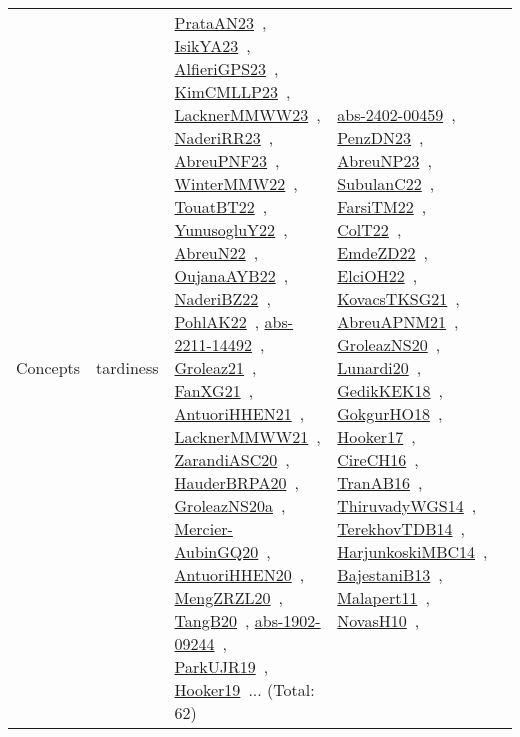 {\begin{longtable}{lp{3cm}>{\raggedright\arraybackslash}p{6cm}>{\raggedright\arraybackslash}p{6cm}>{\raggedright\arraybackslash}p{8cm}}
Concepts & tardiness & \href{works/PrataAN23.pdf}{PrataAN23}~\cite{PrataAN23}, \href{works/IsikYA23.pdf}{IsikYA23}~\cite{IsikYA23}, \href{works/AlfieriGPS23.pdf}{AlfieriGPS23}~\cite{AlfieriGPS23}, \href{works/KimCMLLP23.pdf}{KimCMLLP23}~\cite{KimCMLLP23}, \href{works/LacknerMMWW23.pdf}{LacknerMMWW23}~\cite{LacknerMMWW23}, \href{works/NaderiRR23.pdf}{NaderiRR23}~\cite{NaderiRR23}, \href{works/AbreuPNF23.pdf}{AbreuPNF23}~\cite{AbreuPNF23}, \href{works/WinterMMW22.pdf}{WinterMMW22}~\cite{WinterMMW22}, \href{works/TouatBT22.pdf}{TouatBT22}~\cite{TouatBT22}, \href{works/YunusogluY22.pdf}{YunusogluY22}~\cite{YunusogluY22}, \href{works/AbreuN22.pdf}{AbreuN22}~\cite{AbreuN22}, \href{works/OujanaAYB22.pdf}{OujanaAYB22}~\cite{OujanaAYB22}, \href{works/NaderiBZ22.pdf}{NaderiBZ22}~\cite{NaderiBZ22}, \href{works/PohlAK22.pdf}{PohlAK22}~\cite{PohlAK22}, \href{works/abs-2211-14492.pdf}{abs-2211-14492}~\cite{abs-2211-14492}, \href{works/Groleaz21.pdf}{Groleaz21}~\cite{Groleaz21}, \href{works/FanXG21.pdf}{FanXG21}~\cite{FanXG21}, \href{works/AntuoriHHEN21.pdf}{AntuoriHHEN21}~\cite{AntuoriHHEN21}, \href{works/LacknerMMWW21.pdf}{LacknerMMWW21}~\cite{LacknerMMWW21}, \href{works/ZarandiASC20.pdf}{ZarandiASC20}~\cite{ZarandiASC20}, \href{works/HauderBRPA20.pdf}{HauderBRPA20}~\cite{HauderBRPA20}, \href{works/GroleazNS20a.pdf}{GroleazNS20a}~\cite{GroleazNS20a}, \href{works/Mercier-AubinGQ20.pdf}{Mercier-AubinGQ20}~\cite{Mercier-AubinGQ20}, \href{works/AntuoriHHEN20.pdf}{AntuoriHHEN20}~\cite{AntuoriHHEN20}, \href{works/MengZRZL20.pdf}{MengZRZL20}~\cite{MengZRZL20}, \href{works/TangB20.pdf}{TangB20}~\cite{TangB20}, \href{works/abs-1902-09244.pdf}{abs-1902-09244}~\cite{abs-1902-09244}, \href{works/ParkUJR19.pdf}{ParkUJR19}~\cite{ParkUJR19}, \href{works/Hooker19.pdf}{Hooker19}~\cite{Hooker19}... (Total: 62) & \href{works/abs-2402-00459.pdf}{abs-2402-00459}~\cite{abs-2402-00459}, \href{works/PenzDN23.pdf}{PenzDN23}~\cite{PenzDN23}, \href{works/AbreuNP23.pdf}{AbreuNP23}~\cite{AbreuNP23}, \href{works/SubulanC22.pdf}{SubulanC22}~\cite{SubulanC22}, \href{works/FarsiTM22.pdf}{FarsiTM22}~\cite{FarsiTM22}, \href{works/ColT22.pdf}{ColT22}~\cite{ColT22}, \href{works/EmdeZD22.pdf}{EmdeZD22}~\cite{EmdeZD22}, \href{works/ElciOH22.pdf}{ElciOH22}~\cite{ElciOH22}, \href{works/KovacsTKSG21.pdf}{KovacsTKSG21}~\cite{KovacsTKSG21}, \href{works/AbreuAPNM21.pdf}{AbreuAPNM21}~\cite{AbreuAPNM21}, \href{works/GroleazNS20.pdf}{GroleazNS20}~\cite{GroleazNS20}, \href{works/Lunardi20.pdf}{Lunardi20}~\cite{Lunardi20}, \href{works/GedikKEK18.pdf}{GedikKEK18}~\cite{GedikKEK18}, \href{works/GokgurHO18.pdf}{GokgurHO18}~\cite{GokgurHO18}, \href{works/Hooker17.pdf}{Hooker17}~\cite{Hooker17}, \href{works/CireCH16.pdf}{CireCH16}~\cite{CireCH16}, \href{works/TranAB16.pdf}{TranAB16}~\cite{TranAB16}, \href{works/ThiruvadyWGS14.pdf}{ThiruvadyWGS14}~\cite{ThiruvadyWGS14}, \href{works/TerekhovTDB14.pdf}{TerekhovTDB14}~\cite{TerekhovTDB14}, \href{works/HarjunkoskiMBC14.pdf}{HarjunkoskiMBC14}~\cite{HarjunkoskiMBC14}, \href{works/BajestaniB13.pdf}{BajestaniB13}~\cite{BajestaniB13}, \href{works/Malapert11.pdf}{Malapert11}~\cite{Malapert11}, \href{works/NovasH10.pdf}{NovasH10}~\cite{NovasH10}, 
\end{longtable}}
